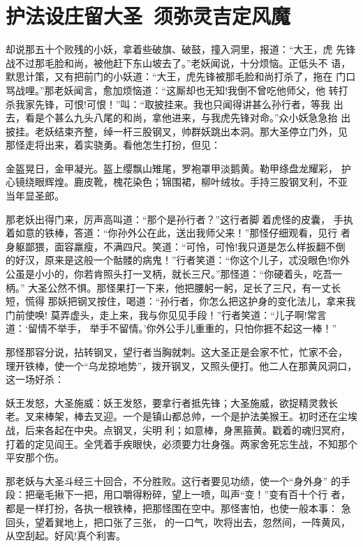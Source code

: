 \chapter{护法设庄留大圣~须弥灵吉定风魔}

却说那五十个败残的小妖，拿着些破旗、破鼓，撞入洞里，报道：“大王，虎
先锋战不过那毛脸和尚，被他赶下东山坡去了。”老妖闻说，十分烦恼。正低头不
语，默思计策，又有把前门的小妖道：“大王，虎先锋被那毛脸和尚打杀了，拖在
门口骂战哩。”那老妖闻言，愈加烦恼道：“这厮却也无知!我倒不曾吃他师父，他
转打杀我家先锋，可恨!可恨！”叫：“取披挂来。我也只闻得讲甚么孙行者，等我
出去，看是个甚么九头八尾的和尚，拿他进来，与我虎先锋对命。”众小妖急急抬
出披挂。老妖结束齐整，绰一杆三股钢叉，帅群妖跳出本洞。那大圣停立门外，见
那怪走将出来，着实骁勇。看他怎生打扮，但见：

金盔晃日，金甲凝光。盔上缨飘山雉尾，罗袍罩甲淡鹅黄。勒甲绦盘龙耀彩，
护心镜绕眼辉煌。鹿皮靴，槐花染色；锦围裙，柳叶绒妆。手持三股钢叉利，不亚
当年显圣郎。

那老妖出得门来，厉声高叫道：“那个是孙行者？”这行者脚着虎怪的皮囊，
手执着如意的铁棒，答道：“你孙外公在此，送出我师父来！”那怪仔细观看，见行
者身躯鄙猥，面容羸瘦，不满四尺。笑道：“可怜，可怜!我只道是怎么样扳翻不倒
的好汉，原来是这般一个骷髅的病鬼！”行者笑道：“你这个儿子，忒没眼色!你外
公虽是小小的，你若肯照头打一叉柄，就长三尺。”那怪道：“你硬着头，吃吾一柄。”
大圣公然不惧。那怪果打一下来，他把腰躬一躬，足长了三尺，有一丈长短，慌得
那妖把钢叉按住，喝道：“孙行者，你怎么把这护身的变化法儿，拿来我门前使唤!
莫弄虚头，走上来，我与你见见手段！”行者笑道：“儿子啊!常言道：‘留情不举手，
举手不留情。’你外公手儿重重的，只怕你捱不起这一棒！”

那怪那容分说，拈转钢叉，望行者当胸就刺。这大圣正是会家不忙，忙家不会，
理开铁棒，使一个“乌龙掠地势”，拨开钢叉，又照头便打。他二人在那黄风洞口，
这一场好杀：

妖王发怒，大圣施威：妖王发怒，要拿行者抵先锋；大圣施威，欲捉精灵救长
老。叉来棒架，棒去叉迎。一个是镇山都总帅，一个是护法美猴王。初时还在尘埃
战，后来各起在中央。点钢叉，尖明利；如意棒，身黑箍黄。戳着的魂归冥府，
打着的定见阎王。全凭着手疾眼快，必须要力壮身强。两家舍死忘生战，不知那个
平安那个伤。

那老妖与大圣斗经三十回合，不分胜败。这行者要见功绩，使一个“身外身”
的手段：把毫毛揪下一把，用口嚼得粉碎，望上一喷，叫声“变！”变有百十个行
者，都是一样打扮，各执一根铁棒，把那怪围在空中。那怪害怕，也使一般本事：
急回头，望着巽地上，把口张了三张，的一口气，吹将出去，忽然间，一阵黄风，
从空刮起。好风!真个利害。

